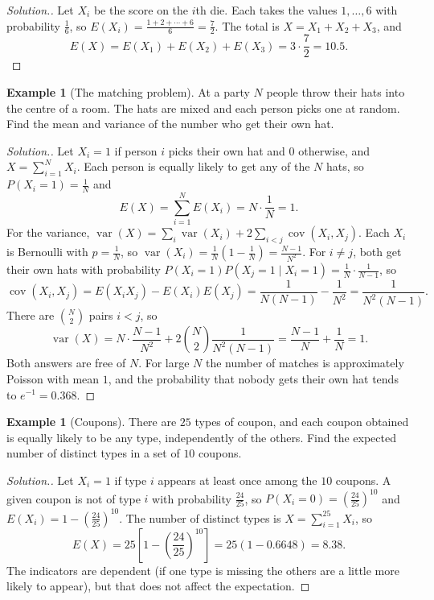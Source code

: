 \documentclass[12pt,a4paper]{report}
\theoremstyle{definition}
\newtheorem{exa}[thm]{Example}
\DeclareMathOperator{\var}{var}
\DeclareMathOperator{\cov}{cov}
\newenvironment{solution}
  {\renewcommand{\qedsymbol}{}\begin{proof}[\textit{Solution}.]}
  {\end{proof}}
\begin{document}
\begin{solution}
Let $X_i$ be the score on the $i$th die. Each takes the values $1, \dots, 6$ with
probability $\frac16$, so $E(X_i) = \frac{1 + 2 + \cdots + 6}{6} = \frac72$. The total is
$X = X_1 + X_2 + X_3$, and
\[E(X) = E(X_1) + E(X_2) + E(X_3) = 3\cdot\frac72 = 10.5 .\]
\end{solution}

\begin{exa}[The matching problem]
\label{ex:hats}
At a party $N$ people throw their hats into the centre of a room. The hats are mixed and
each person picks one at random. Find the mean and variance of the number who get their
own hat.
\end{exa}

\begin{solution}
Let $X_i = 1$ if person $i$ picks their own hat and $0$ otherwise, and $X = \sum_{i=1}^N X_i$.
Each person is equally likely to get any of the $N$ hats, so $P(X_i = 1) = \frac1N$ and
\[E(X) = \sum_{i=1}^N E(X_i) = N\cdot\frac1N = 1 .\]
For the variance, $\var(X) = \sum_i\var(X_i) + 2\sum_{i<j}\cov(X_i, X_j)$. Each $X_i$ is
Bernoulli with $p = \frac1N$, so $\var(X_i) = \frac1N\left(1 - \frac1N\right) = \frac{N - 1}{N^2}$.
For $i\ne j$, both get their own hats with probability
$P(X_i = 1)P(X_j = 1\mid X_i = 1) = \frac1N\cdot\frac{1}{N - 1}$, so
\[\cov(X_i, X_j) = E(X_iX_j) - E(X_i)E(X_j) = \frac{1}{N(N - 1)} - \frac{1}{N^2} = \frac{1}{N^2(N - 1)} .\]
There are $\binom N2$ pairs $i<j$, so
\[\var(X) = N\cdot\frac{N - 1}{N^2} + 2\binom N2\frac{1}{N^2(N - 1)} = \frac{N - 1}{N} + \frac{1}{N} = 1 .\]
Both answers are free of $N$. For large $N$ the number of matches is approximately
Poisson with mean $1$, and the probability that nobody gets their own hat tends to
$e^{-1} = 0.368$.
\end{solution}

\begin{exa}[Coupons]
\label{ex:coupons}
There are $25$ types of coupon, and each coupon obtained is equally likely to be any
type, independently of the others. Find the expected number of distinct types in a set of
$10$ coupons.
\end{exa}

\begin{solution}
Let $X_i = 1$ if type $i$ appears at least once among the $10$ coupons. A given coupon is
not of type $i$ with probability $\frac{24}{25}$, so
$P(X_i = 0) = \left(\frac{24}{25}\right)^{10}$ and $E(X_i) = 1 - \left(\frac{24}{25}\right)^{10}$.
The number of distinct types is $X = \sum_{i=1}^{25}X_i$, so
\[E(X) = 25\left[1 - \left(\frac{24}{25}\right)^{10}\right] = 25(1 - 0.6648) = 8.38 .\]
The indicators are dependent (if one type is missing the others are a little more
likely to appear), but that does not affect the expectation.
\end{solution}
\end{document}
